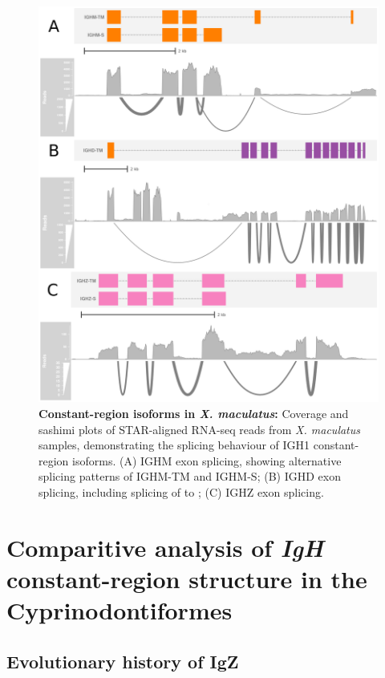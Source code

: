 		\begin{figure}
	\includegraphics[width=\textwidth]{_Figures/png/xma-locus-sashimi}
	\caption[Constant-region isoforms in \textit{X. maculatus}]{\textbf{Constant-region isoforms in \textit{X. maculatus}:} Coverage and sashimi plots of STAR-aligned RNA-seq reads from \textit{X. maculatus} samples, demonstrating the splicing behaviour of IGH1 constant-region isoforms. (A) IGHM exon splicing, showing alternative splicing patterns of IGHM-TM and IGHM-S; (B) IGHD exon splicing, including splicing of  to ; (C) IGHZ exon splicing.}
	\label{fig:xma-locus-sashimi}
	\end{figure}


\section{Comparitive analysis of \textit{IgH} constant-region structure in the Cyprinodontiformes}

	\subsection{Evolutionary history of IgZ}
	
